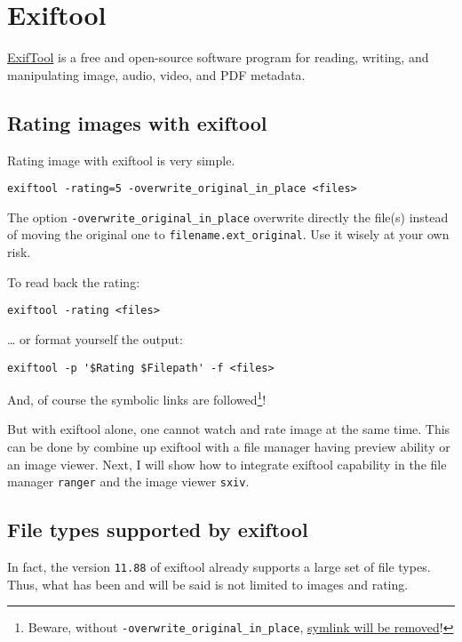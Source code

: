 \documentclass[11pt]{article}
\begin{document}
\section{Exiftool}
\label{sec:org587c206}

\href{https://exiftool.org/}{ExifTool} is a free and open-source software program for reading, writing, and
manipulating image, audio, video, and PDF metadata. 
\subsection{Rating images with exiftool}
\label{sec:orge3f5f41}
Rating image with exiftool is very simple.
\begin{verbatim}
exiftool -rating=5 -overwrite_original_in_place <files>
\end{verbatim}
The option \texttt{-overwrite\_original\_in\_place} overwrite directly the file(s) instead
of moving the original one to \texttt{filename.ext\_original}. Use it wisely at your own risk.

To read back the rating:
\begin{verbatim}
exiftool -rating <files>
\end{verbatim}
\ldots{} or format yourself the output: 
\begin{verbatim}
exiftool -p '$Rating $Filepath' -f <files>
\end{verbatim}

And, of course the symbolic links are followed\footnote{Beware, without \texttt{-overwrite\_original\_in\_place}, \href{https://exiftool.org/forum/index.php?topic=6308.0}{symlink will be removed}!}!

But with exiftool alone, one cannot watch and rate image at the same time. 
This can be done by combine up exiftool with a file manager having preview ability
or an image viewer. Next, I will show how to integrate exiftool capability in
the file manager \texttt{ranger} and the image viewer \texttt{sxiv}.

\subsection{File types supported by exiftool}
\label{sec:org78aac9f}

In fact, the version \texttt{11.88} of exiftool already supports a large set of file types.
Thus, what has been and will be said is not limited to images and rating.
\end{document}
